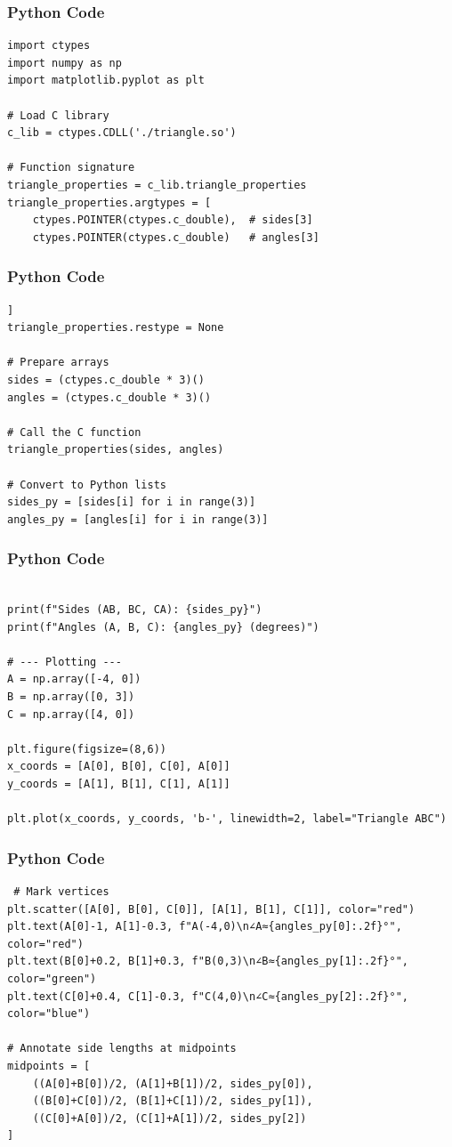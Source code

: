 \documentclass{beamer}
\begin{document}
\begin{frame}[fragile]
    \frametitle{Python Code }
\begin{lstlisting}
import ctypes
import numpy as np
import matplotlib.pyplot as plt

# Load C library
c_lib = ctypes.CDLL('./triangle.so')

# Function signature
triangle_properties = c_lib.triangle_properties
triangle_properties.argtypes = [
    ctypes.POINTER(ctypes.c_double),  # sides[3]
    ctypes.POINTER(ctypes.c_double)   # angles[3]
\end{lstlisting}
\end{frame}


\begin{frame}[fragile]
    \frametitle{Python Code }
\begin{lstlisting}
]
triangle_properties.restype = None

# Prepare arrays
sides = (ctypes.c_double * 3)()
angles = (ctypes.c_double * 3)()

# Call the C function
triangle_properties(sides, angles)

# Convert to Python lists
sides_py = [sides[i] for i in range(3)]
angles_py = [angles[i] for i in range(3)]
\end{lstlisting}
\end{frame}

\begin{frame}[fragile]
    \frametitle{Python Code }
\begin{lstlisting}
 
print(f"Sides (AB, BC, CA): {sides_py}")
print(f"Angles (A, B, C): {angles_py} (degrees)")

# --- Plotting ---
A = np.array([-4, 0])
B = np.array([0, 3])
C = np.array([4, 0])

plt.figure(figsize=(8,6))
x_coords = [A[0], B[0], C[0], A[0]]
y_coords = [A[1], B[1], C[1], A[1]]

plt.plot(x_coords, y_coords, 'b-', linewidth=2, label="Triangle ABC")
\end{lstlisting}
\end{frame}


\begin{frame}[fragile]
\frametitle{Python Code}
\begin{lstlisting}
 # Mark vertices
plt.scatter([A[0], B[0], C[0]], [A[1], B[1], C[1]], color="red")
plt.text(A[0]-1, A[1]-0.3, f"A(-4,0)\n∠A≈{angles_py[0]:.2f}°", color="red")
plt.text(B[0]+0.2, B[1]+0.3, f"B(0,3)\n∠B≈{angles_py[1]:.2f}°", color="green")
plt.text(C[0]+0.4, C[1]-0.3, f"C(4,0)\n∠C≈{angles_py[2]:.2f}°", color="blue")

# Annotate side lengths at midpoints
midpoints = [
    ((A[0]+B[0])/2, (A[1]+B[1])/2, sides_py[0]),
    ((B[0]+C[0])/2, (B[1]+C[1])/2, sides_py[1]),
    ((C[0]+A[0])/2, (C[1]+A[1])/2, sides_py[2])
]
  \end{lstlisting}
\end{frame}
\end{document}
